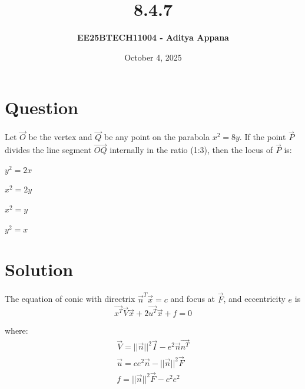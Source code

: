 \documentclass[12pt]{article}
\title{\textbf{8.4.7}}
\author{\textbf{EE25BTECH11004 - Aditya Appana}}
\date{October 4, 2025}
\begin{document}
\maketitle

\section*{Question}
Let $\vec{O}$ be the vertex and $\vec{Q}$ be any point on the parabola $x^2 = 8y$. If the point $\vec{P}$ divides the line segment $\vec{OQ}$ internally in the ratio (1:3), then the locus of $\vec{P}$ is:
\begin{enumerate}
\begin{multicols}{4}
    \item $y^2 = 2x$
    \item $x^2 = 2y$
    \item $x^2 = y$
    \item $y^2 = x$
    \end{multicols}
\end{enumerate}
\section*{Solution}

The equation of conic with directrix $\vec{n}^T\vec{x} = c$ and focus at $\vec{F}$, and eccentricity $e$ is
$$ \vec{x^T}\vec{V}\vec{x} + 2\vec{u^T}\vec{x} + f = 0$$

where:
\begin{align*}
    \vec{V} = ||\vec{n}||^2\vec{I} - e^2\vec{n}\vec{n^T}\\
    \vec{u} = ce^2\vec{n} - ||\vec{n}||^2\vec{F}\\
    f=||\vec{n}||^2\vec{F} - c^2e^2
\end{align*}
\end{document}
